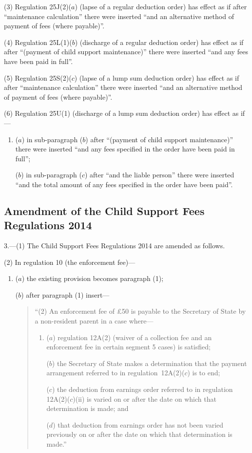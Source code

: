 \documentclass[12pt,a4paper]{article}
\begin{document}
(3)
Regulation 25J(2)($a$) (lapse of a regular deduction order) has effect as if after “maintenance calculation” there were inserted “and an alternative method of payment of fees (where payable)”.

(4)
Regulation 25L(1)($b$) (discharge of a regular deduction order) has effect as if after “(payment of child support maintenance)” there were inserted “and any fees have been paid in full”.

(5)
Regulation 25S(2)($c$) (lapse of a lump sum deduction order) has effect as if after “maintenance calculation” there were inserted “and an alternative method of payment of fees (where payable)”.

(6)
Regulation 25U(1) (discharge of a lump sum deduction order) has effect as if—
\begin{enumerate}\item[]
($a$)
in sub-paragraph ($b$) after “(payment of child support maintenance)” there were inserted “and any fees specified in the order have been paid in full”;

($b$)
in sub-paragraph ($c$) after “and the liable person” there were inserted “and the total amount of any fees specified in the order have been paid”.
\end{enumerate}

\subsection[3. Amendment of the Child Support Fees Regulations 2014]{Amendment of the Child Support Fees Regulations 2014}

3.---(1)
The Child Support Fees Regulations 2014 are amended as follows.

(2)
In regulation 10 (the enforcement fee)—
\begin{enumerate}\item[]
($a$)
the existing provision becomes paragraph (1);

($b$)
after paragraph (1) insert—
\begin{quotation}
    ``(2)
    An enforcement fee of £50 is payable to the Secretary of State by a non-resident parent in a case where—
\begin{enumerate}\item[]
    ($a$)
    regulation 12A(2) (waiver of a collection fee and an enforcement fee in certain segment 5 cases) is satisfied;

\begin{sloppypar}
    ($b$)
    the Secretary of State makes a determination that the payment arrangement referred to in regulation~12A(2)($c$) is to end;
\end{sloppypar}

    ($c$)
    the deduction from earnings order referred to in regulation 12A(2)($c$)(ii) is varied on or after the date on which that determination is made; and

    ($d$)
    that deduction from earnings order has not been varied previously on or after the date on which that determination is made.”
\end{enumerate}
\end{quotation}
\end{enumerate}
\end{document}

